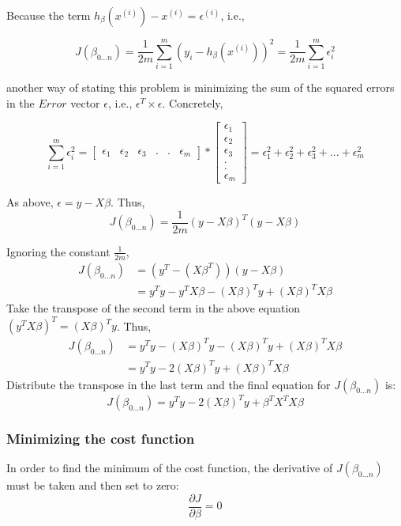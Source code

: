 \documentclass{article}
\begin{document}
	Because the term $h_\beta(x^{(i)})-x^{(i)}=\epsilon^{(i)}$, i.e.,
	
	\begin{equation*}
	J(\beta_{0...n})= \frac{1}{2m}\sum_{i=1}^{m}(y_i - h_\beta(x^{(i)}))^2=\frac{1}{2m}\sum_{i=1}^{m}\epsilon_i^2
	\end{equation*}
	
	another way of stating this problem is minimizing the sum of the squared errors in the $Error$ vector $\epsilon$, i.e., $\epsilon^{T}\times\epsilon$. Concretely,
	
	\begin{equation*}
	\sum_{i=1}^{m}\epsilon_i^2 = \begin{bmatrix}
	\epsilon_1&\epsilon_2&\epsilon_3&.&.&\epsilon_m
	\end{bmatrix}
	*
	\begin{bmatrix}
	\epsilon_1\\
	\epsilon_2\\
	\epsilon_3\\
	.\\
	.\\
	\epsilon_m
	\end{bmatrix}=\epsilon_1^2+\epsilon_2^2+\epsilon_3^2+...+\epsilon_m^2
	\end{equation*}
	
	As above, $\epsilon=y-X\beta$. Thus,
	\begin{equation*}
	J(\beta_{0...n})=\frac{1}{2m}(y-X\beta)^{T}(y-X\beta)
	\end{equation*}
	
	Ignoring the constant $\frac{1}{2m}$,
	\begin{align*}
	J(\beta_{0...n})&=(y^T-(X\beta^T))(y-X\beta)\\
	&=y^Ty-y^TX\beta-(X\beta)^Ty+(X\beta)^TX\beta
	\end{align*}
	Take the transpose of the second term in the above equation $(y^TX\beta)^T=(X\beta)^Ty$. Thus,
	\begin{align*}
	J(\beta_{0...n})&=y^Ty-(X\beta)^Ty-(X\beta)^Ty+(X\beta)^TX\beta\\
	&=y^Ty-2(X\beta)^Ty+(X\beta)^TX\beta
	\end{align*}
	Distribute the transpose in the last term and the final equation for $J(\beta_{0...n})$ is:
	\begin{equation*}
	J(\beta_{0...n})= y^Ty-2(X\beta)^Ty+\beta^{T}X^TX\beta
	\end{equation*}
	
	\subsubsection{Minimizing the cost function}
	In order to find the minimum of the cost function, the derivative of $J(\beta_{0...n})$ must be taken and then set to zero:
	\begin{equation*}
	\frac{\partial{J}}{\partial{\beta}}=0
	\end{equation*}
	
\end{document}

